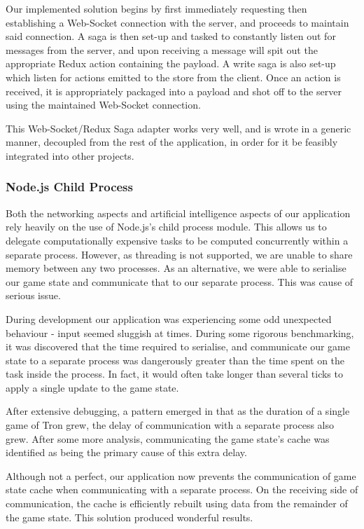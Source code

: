 \documentclass{standalone}
\begin{document}
				Our implemented solution begins by first immediately requesting then establishing a Web-Socket connection with the server, and proceeds to maintain said connection. A saga is then set-up and tasked to constantly listen out for messages from the server, and upon receiving a message will spit out the appropriate Redux action containing the payload. A write saga is also set-up which listen for actions emitted to the store from the client. Once an action is received, it is appropriately packaged into a payload and shot off to the server using the maintained Web-Socket connection.

				This Web-Socket/Redux Saga adapter works very well, and is wrote in a generic manner, decoupled from the rest of the application, in order for it be feasibly integrated into other projects.

			\subsubsection{Node.js Child Process}
				Both the networking aspects and artificial intelligence aspects of our application rely heavily on the use of Node.js's child process module. This allows us to delegate computationally expensive tasks to be computed concurrently within a separate process. However, as threading is not supported, we are unable to share memory between any two processes. As an alternative, we were able to serialise our game state and communicate that to our separate process. This was cause of serious issue. 

				During development our application was experiencing some odd unexpected behaviour - input seemed sluggish at times. During some rigorous benchmarking, it was discovered that the time required to serialise, and communicate our game state to a separate process was dangerously greater than the time spent on the task inside the process. In fact, it would often take longer than several ticks to apply a single update to the game state.

				After extensive debugging, a pattern emerged in that as the duration of a single game of Tron grew, the delay of communication with a separate process also grew. After some more analysis, communicating the game state's cache was identified as being the primary cause of this extra delay.

				Although not a perfect, our application now prevents the communication of game state cache when communicating with a separate process. On the receiving side of communication, the cache is efficiently rebuilt using data from the remainder of the game state. This solution produced wonderful results.
\end{document}
